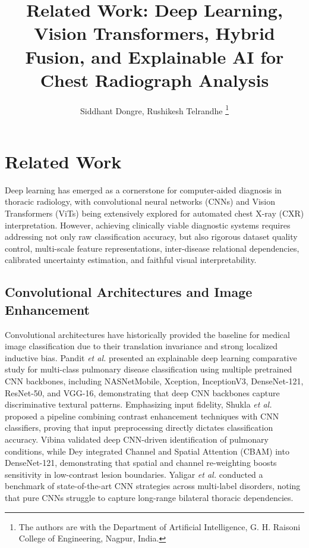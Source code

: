 \documentclass[journal]{IEEEtran}
\begin{document}
\title{Related Work: Deep Learning, Vision Transformers, Hybrid Fusion, and Explainable AI for Chest Radiograph Analysis}

\author{Siddhant Dongre, Rushikesh Telrandhe
\thanks{The authors are with the Department of Artificial Intelligence, G. H. Raisoni College of Engineering, Nagpur, India.}
}

\maketitle

\section{Related Work}
\label{sec:related_work}

Deep learning has emerged as a cornerstone for computer-aided diagnosis in thoracic radiology, with convolutional neural networks (CNNs) and Vision Transformers (ViTs) being extensively explored for automated chest X-ray (CXR) interpretation. However, achieving clinically viable diagnostic systems requires addressing not only raw classification accuracy, but also rigorous dataset quality control, multi-scale feature representations, inter-disease relational dependencies, calibrated uncertainty estimation, and faithful visual interpretability.

\subsection{Convolutional Architectures and Image Enhancement}
Convolutional architectures have historically provided the baseline for medical image classification due to their translation invariance and strong localized inductive bias. Pandit \textit{et al.} \cite{pandit2025explainable} presented an explainable deep learning comparative study for multi-class pulmonary disease classification using multiple pretrained CNN backbones, including NASNetMobile, Xception, InceptionV3, DenseNet-121, ResNet-50, and VGG-16, demonstrating that deep CNN backbones capture discriminative textural patterns. Emphasizing input fidelity, Shukla \textit{et al.} \cite{shukla2026chest} proposed a pipeline combining contrast enhancement techniques with CNN classifiers, proving that input preprocessing directly dictates classification accuracy. Vibina \cite{vibina2025deep} validated deep CNN-driven identification of pulmonary conditions, while Dey \cite{dey2025cbam} integrated Channel and Spatial Attention (CBAM) into DenseNet-121, demonstrating that spatial and channel re-weighting boosts sensitivity in low-contrast lesion boundaries. Yaligar \textit{et al.} \cite{yaligar2024state} conducted a benchmark of state-of-the-art CNN strategies across multi-label disorders, noting that pure CNNs struggle to capture long-range bilateral thoracic dependencies.
\end{document}
